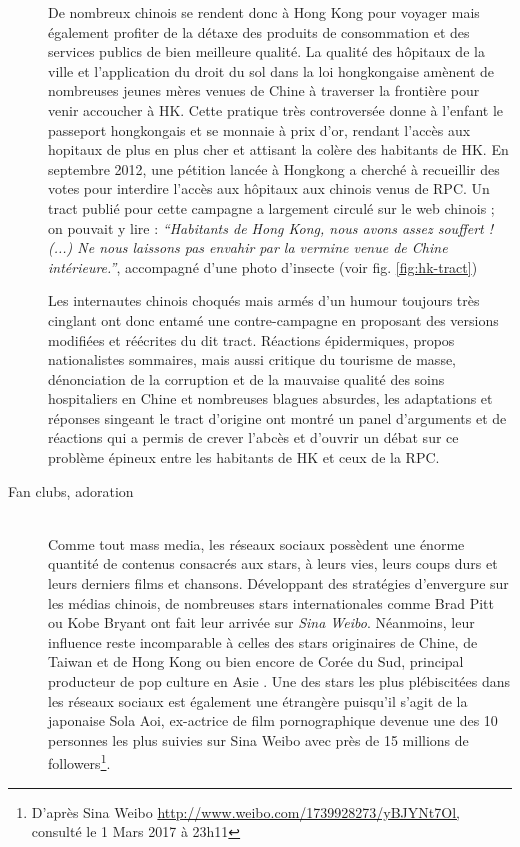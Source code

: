 \begin{description}
De nombreux chinois se rendent donc à Hong Kong pour voyager mais également profiter de la détaxe des produits de consommation et des services publics de bien meilleure qualité. La qualité des hôpitaux de la ville et l{\textquoteright}application du droit du sol dans la loi hongkongaise amènent de nombreuses jeunes mères venues de Chine à traverser la frontière pour venir accoucher à HK. Cette pratique très controversée donne à l{\textquoteright}enfant le passeport hongkongais et se monnaie à prix d{\textquoteright}or, rendant l{\textquoteright}accès aux hopitaux de plus en plus cher et attisant la colère des habitants de HK. En septembre 2012, une pétition lancée à Hongkong a cherché à recueillir des votes pour interdire l{\textquoteright}accès aux hôpitaux aux chinois venus de RPC. Un tract publié pour cette campagne a largement circulé sur le web chinois ; on pouvait y lire :\textit{ {\textquotedblleft}Habitants de Hong Kong, nous avons assez souffert ! (...) Ne nous laissons pas envahir par la vermine venue de Chine intérieure.{\textquotedblright}}, accompagné d'une photo d'insecte (voir fig. \ref{fig:hk-tract})

Les internautes chinois choqués mais armés d{\textquoteright}un humour toujours très cinglant ont donc entamé une contre-campagne en proposant des versions modifiées et réécrites du dit tract. Réactions épidermiques, propos nationalistes sommaires, mais aussi critique du tourisme de masse, dénonciation de la corruption et de la mauvaise qualité des soins hospitaliers en Chine et nombreuses blagues absurdes, les adaptations et réponses singeant le tract d{\textquoteright}origine ont montré un panel d{\textquoteright}arguments et de réactions qui a permis de crever l{\textquoteright}abcès et d{\textquoteright}ouvrir un débat sur ce problème épineux entre les habitants de HK et ceux de la RPC.  


\item[Fan clubs, adoration]
\hfill \\
Comme tout mass media, les réseaux sociaux possèdent une énorme quantité de contenus consacrés aux stars, à leurs vies, leurs coups durs et leurs derniers films et chansons. Développant des stratégies d{\textquoteright}envergure sur les médias chinois, de nombreuses stars internationales comme Brad Pitt ou Kobe Bryant ont fait leur arrivée sur \textit{Sina Weibo}. Néanmoins, leur influence reste incomparable à celles des stars originaires de Chine, de Taiwan et de Hong Kong ou bien encore de Corée du Sud, principal producteur de pop culture en Asie \citep{Martel2010}. Une des stars les plus plébiscitées dans les réseaux sociaux est également une étrangère puisqu{\textquoteright}il s{\textquoteright}agit de la japonaise Sola Aoi, ex-actrice de film pornographique devenue une des 10 personnes les plus suivies sur Sina Weibo avec près de 15 millions de followers\footnote{ D{\textquoteright}après Sina Weibo \url{http://www.weibo.com/1739928273/yBJYNt7Ol,} consulté le 1 Mars 2017 à 23h11}. 


\end{description}

